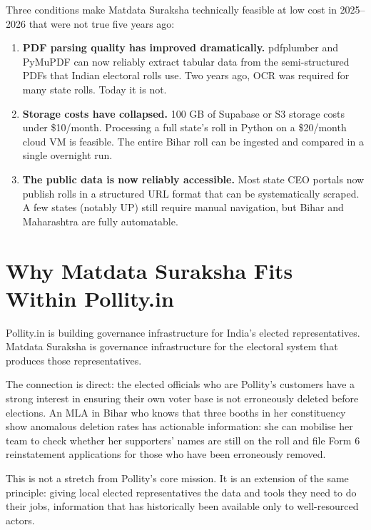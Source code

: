 \documentclass[11pt, a4paper]{article}
\begin{document}
Three conditions make Matdata Suraksha technically feasible at low cost in 2025--2026 that were not true five years ago:

\begin{enumerate}[leftmargin=1.5em, itemsep=5pt]
  \item \textbf{PDF parsing quality has improved dramatically.} pdfplumber and PyMuPDF can now reliably extract tabular data from the semi-structured PDFs that Indian electoral rolls use. Two years ago, OCR was required for many state rolls. Today it is not.

  \item \textbf{Storage costs have collapsed.} 100 GB of Supabase or S3 storage costs under \$10/month. Processing a full state's roll in Python on a \$20/month cloud VM is feasible. The entire Bihar roll can be ingested and compared in a single overnight run.

  \item \textbf{The public data is now reliably accessible.} Most state CEO portals now publish rolls in a structured URL format that can be systematically scraped. A few states (notably UP) still require manual navigation, but Bihar and Maharashtra are fully automatable.
\end{enumerate}

\section{Why Matdata Suraksha Fits Within Pollity.in}

Pollity.in is building governance infrastructure for India's elected representatives. Matdata Suraksha is governance infrastructure for the electoral system that produces those representatives.

The connection is direct: the elected officials who are Pollity's customers have a strong interest in ensuring their own voter base is not erroneously deleted before elections. An MLA in Bihar who knows that three booths in her constituency show anomalous deletion rates has actionable information: she can mobilise her team to check whether her supporters' names are still on the roll and file Form 6 reinstatement applications for those who have been erroneously removed.

This is not a stretch from Pollity's core mission. It is an extension of the same principle: giving local elected representatives the data and tools they need to do their jobs, information that has historically been available only to well-resourced actors.
\end{document}
